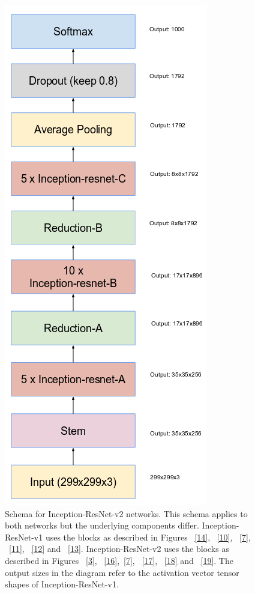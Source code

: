 \documentclass[a4paper,12pt, twoside]{NITKReport}
\begin{document}
\begin{figure}
\begin{minipage}[b]{0.4\textwidth}
    \includegraphics[width=\textwidth]{figure15.png}
    \caption{Schema for Inception-ResNet-v2 networks.  This schema applies to both networks but the underlying components differ.  Inception-ResNet-v1 uses the blocks as described in Figures ~\ref{14}, ~\ref{10}, ~\ref{7}, ~\ref{11}, ~\ref{12} and ~\ref{13}. Inception-ResNet-v2 uses the blocks as described in Figures ~\ref{3}, ~\ref{16},~\ref{7}, ~\ref{17}, ~\ref{18} and  ~\ref{19}. The output sizes in the diagram refer to the  activation vector tensor shapes of Inception-ResNet-v1.}
    \label{15}
  \end{minipage}
\end{figure}
\end{document}
